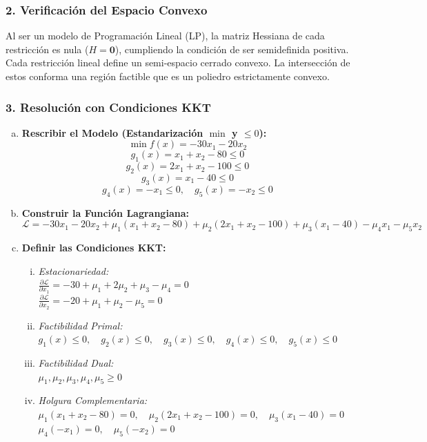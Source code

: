\documentclass{article}
\begin{document}
	\subsubsection*{2. Verificación del Espacio Convexo}
	Al ser un modelo de Programación Lineal (LP), la matriz Hessiana de cada restricción es nula ($H=\mathbf{0}$), cumpliendo la condición de ser semidefinida positiva. Cada restricción lineal define un semi-espacio cerrado convexo. La intersección de estos conforma una región factible que es un poliedro estrictamente convexo.
	
	\subsubsection*{3. Resolución con Condiciones KKT}
	\begin{enumerate}[a)]
		\item \textbf{Rescribir el Modelo (Estandarización $\min$ y $\leq 0$):}\\
		$$ \min f(x) = -30x_1 - 20x_2 $$
		$$ g_1(x) = x_1 + x_2 - 80 \leq 0 $$
		$$ g_2(x) = 2x_1 + x_2 - 100 \leq 0 $$
		$$ g_3(x) = x_1 - 40 \leq 0 $$
		$$ g_4(x) = -x_1 \leq 0, \quad g_5(x) = -x_2 \leq 0 $$
		
		\item \textbf{Construir la Función Lagrangiana:}\\
		$$ \mathcal{L} = -30x_1 - 20x_2 + \mu_1(x_1 + x_2 - 80) + \mu_2(2x_1 + x_2 - 100) + \mu_3(x_1 - 40) - \mu_4 x_1 - \mu_5 x_2 $$
		
		\item \textbf{Definir las Condiciones KKT:}
		\begin{enumerate}[i)]
			\item \textit{Estacionariedad:}\\
			$\frac{\partial \mathcal{L}}{\partial x_1} = -30 + \mu_1 + 2\mu_2 + \mu_3 - \mu_4 = 0$\\
			$\frac{\partial \mathcal{L}}{\partial x_2} = -20 + \mu_1 + \mu_2 - \mu_5 = 0$
			\item \textit{Factibilidad Primal:}\\
			$g_1(x) \leq 0, \quad g_2(x) \leq 0, \quad g_3(x) \leq 0, \quad g_4(x) \leq 0, \quad g_5(x) \leq 0$
			\item \textit{Factibilidad Dual:}\\
			$\mu_1, \mu_2, \mu_3, \mu_4, \mu_5 \geq 0$
			\item \textit{Holgura Complementaria:}\\
			$\mu_1(x_1 + x_2 - 80) = 0, \quad \mu_2(2x_1 + x_2 - 100) = 0, \quad \mu_3(x_1 - 40) = 0$\\
			$\mu_4(-x_1) = 0, \quad \mu_5(-x_2) = 0$
		\end{enumerate}
		

\end{enumerate}
\end{document}
